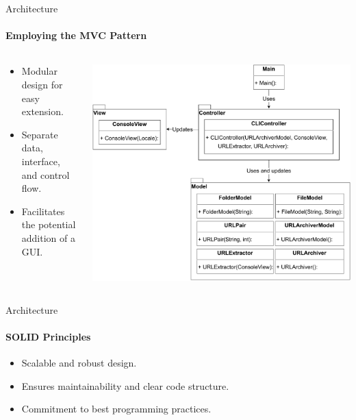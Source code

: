 \documentclass[
    ngerman,%
    authorontitle=true,
]{bfhbeamer}
\begin{document}
    \begin{frame}{Architecture}
        \framesubtitle{Employing the MVC Pattern}

        \begin{columns} %
            \begin{column}{0.5\textwidth} %
                \begin{itemize}
                    \item Modular design for easy extension.
                    \item Separate data, interface, and control flow.
                    \item Facilitates the potential addition of a GUI.
                \end{itemize}
            \end{column}

            \begin{column}{0.5\textwidth} %
                \includegraphics[width=1\textwidth]{pictures/mvc_diagram}
            \end{column}
        \end{columns} %
    \end{frame}

    \begin{frame}{Architecture}
        \framesubtitle{SOLID Principles}
        \begin{itemize}
            \item Scalable and robust design.
            \item Ensures maintainability and clear code structure.
            \item Commitment to best programming practices.
        \end{itemize}
    \end{frame}
\end{document}
